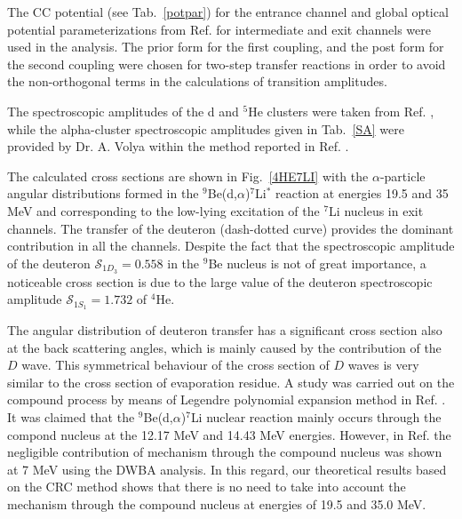 \documentclass[10pt]{iopart}
\begin{document}
The CC potential (see Tab.~\ref{potpar}) for the entrance channel and global optical potential parameterizations from Ref. \cite{globalTriton, globalAlpha, global6Li} for intermediate and exit channels were used in the analysis. 
The prior form for the first coupling, and the post form for the second coupling were chosen for two-step transfer reactions in order to avoid the non-orthogonal terms in the calculations of transition amplitudes.


The spectroscopic amplitudes of the d and ${}^5$He clusters were taken from Ref. \cite{fiveSA}, while the alpha-cluster spectroscopic amplitudes given in Tab.~\ref{SA} were provided by Dr. A. Volya within the method reported in Ref. \cite{volya2017}.

The calculated cross sections are shown in Fig.~\ref{4HE7LI} with the $\alpha$-particle angular distributions formed in the ${}^9$Be(d,$\alpha$)${}^7$Li$^*$ reaction at energies 19.5 and 35 MeV and corresponding to the low-lying excitation of the ${}^7$Li nucleus in exit channels. The transfer of the deuteron (dash-dotted curve) provides the dominant contribution in all the channels. Despite the fact that the spectroscopic amplitude of the deuteron $\mathcal{S}_{1{D}_3}=0.558$ in the $^9$Be nucleus is not of great importance, a noticeable cross section is due to the large value of the deuteron spectroscopic amplitude $\mathcal{S}_{1{S}_1}=1.732$  of ${}^4$He. 

The angular distribution of deuteron transfer has a significant cross section also at the back scattering angles, which is mainly caused by the contribution of the $D$ wave. 
This symmetrical behaviour of the cross section of $D$ waves is very similar to the cross section of evaporation residue. 
A study was carried out on the compound process by means of Legendre polynomial expansion method in Ref. \cite{tanaka1978}. 
It was claimed that the ${}^9$Be(d,$\alpha$)${}^7$Li nuclear reaction mainly occurs through the compond nucleus at the 12.17 MeV and 14.43 MeV energies.  
However, in Ref. \cite{bodek1989} the negligible contribution of mechanism through the compound nucleus was shown at 7 MeV using the DWBA analysis.
 In this regard, our theoretical results based on the CRC method shows that there is no need to take into account the mechanism through the compound nucleus at energies of 19.5 and 35.0 MeV.
\end{document}
